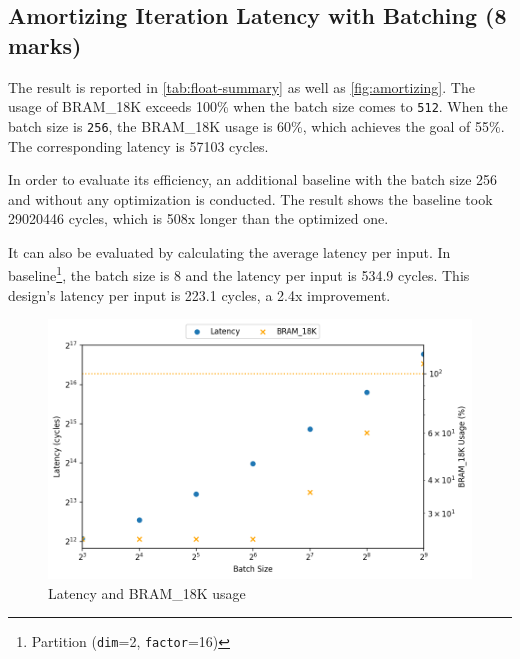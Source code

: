 \subsection{Amortizing Iteration Latency with Batching (8 marks)}
\label{sec:1d}


The result is reported in \autoref{tab:float-summary} as well as \autoref{fig:amortizing}.
The usage of BRAM\_18K exceeds 100\% when the batch size comes to \texttt{512}.
When the batch size is \texttt{256}, the BRAM\_18K usage is 60\%, which achieves the goal of 55\%.
The corresponding latency is 57103 cycles.

In order to evaluate its efficiency, an additional baseline with the batch size 256 and without any optimization is conducted.
The result shows the baseline took 29020446 cycles, which is 508x longer than the optimized one.

It can also be evaluated by calculating the average latency per input.
In baseline\footnote{Partition (\texttt{dim}=2, \texttt{factor}=16)}, the batch size is 8 and the latency per input is 534.9 cycles.
This design's latency per input is 223.1 cycles, a 2.4x improvement.

\begin{figure}
    \centering
    \includegraphics[scale=0.64]{images/amortizing.png}
    \caption{Latency and BRAM\_18K usage}
    \label{fig:amortizing}
\end{figure}
